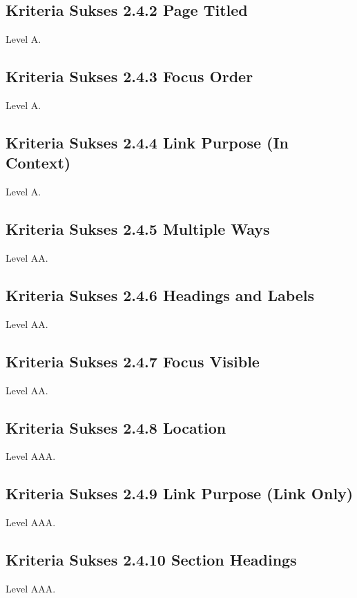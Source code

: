 {\subsection{Kriteria Sukses 2.4.2 Page Titled}
\label{sec:kriteria_2.4.2}
Level A.

\subsection{Kriteria Sukses 2.4.3 Focus Order}
\label{sec:kriteria_2.4.3}
Level A.

\subsection{Kriteria Sukses 2.4.4 Link Purpose (In Context)}
\label{sec:kriteria_2.4.4}
Level A.

\subsection{Kriteria Sukses 2.4.5 Multiple Ways}
\label{sec:kriteria_2.4.5}
Level AA.

\subsection{Kriteria Sukses 2.4.6 Headings and Labels}
\label{sec:kriteria_2.4.6}
Level AA.

\subsection{Kriteria Sukses 2.4.7 Focus Visible}
\label{sec:kriteria_2.4.7}
Level AA.

\subsection{Kriteria Sukses 2.4.8 Location}
\label{sec:kriteria_2.4.8}
Level AAA.

\subsection{Kriteria Sukses 2.4.9 Link Purpose (Link Only)}
\label{sec:kriteria_2.4.9}
Level AAA.

\subsection{Kriteria Sukses 2.4.10 Section Headings}
\label{sec:kriteria_2.4.10}
Level AAA.

}

